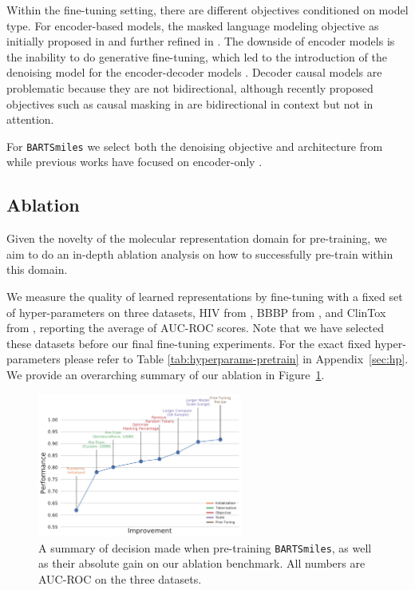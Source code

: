 \documentclass{article} %
\newcommand{\MODEL}{\texttt{BARTSmiles}}
\begin{document}
Within the fine-tuning setting, there are different objectives conditioned on model type. For encoder-based models, the masked language modeling objective as initially proposed in \citet{bert} and further refined in \citet{ROBERTA}. The downside of encoder models is the inability to do generative fine-tuning, which led to the introduction of the denoising model for the encoder-decoder models \citet{BART}. Decoder causal models are problematic because they are not bidirectional, although recently proposed objectives such as causal masking in \citet{CM3} are bidirectional in context but not in attention.

For \MODEL{} we select both the denoising objective and architecture from \citet{BART} while previous works have focused on encoder-only \citep{SMILES_BERT, chemberta}.

\subsection{Ablation}
Given the novelty of the molecular representation domain for pre-training, we aim to do an in-depth ablation analysis on how to successfully pre-train within this domain.

We measure the quality of learned representations by fine-tuning with a fixed set of hyper-parameters on three datasets, HIV from \citet{moleculenet}, BBBP from \citet{bbbp}, and ClinTox from \citet{moleculenet}, reporting the average of AUC-ROC scores. Note that we have selected these datasets before our final fine-tuning experiments. For the exact fixed hyper-parameters please refer to Table \ref{tab:hyperparams-pretrain} in Appendix~\ref{sec:hp}. We provide an overarching summary of our ablation in Figure~\ref{fig:ablation_summary}.

\begin{figure}
  \centering
    \includegraphics[width=0.6\textwidth]{figures/chem_ablation.pdf}
    \caption{A summary of decision made when pre-training \MODEL{}, as well as their absolute gain on our ablation benchmark. All numbers are AUC-ROC on the three datasets.}
    \label{fig:ablation_summary}
\end{figure}
\end{document}
